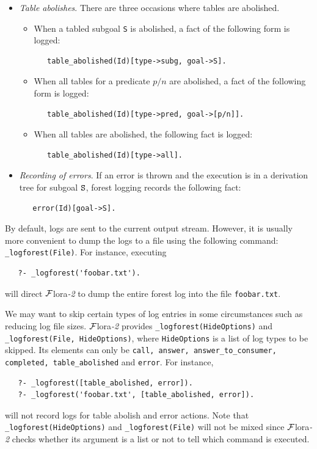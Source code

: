 \documentclass[11pt]{article}
\newcommand{\FLORA}{{\mbox{\sc ${\cal F}${lora}\rm\emph{-2}}}\xspace}
\begin{document}
\begin{itemize}
\item \emph{Table abolishes}. There are three occasions where tables are abolished.
  \begin{itemize}
  \item When a tabled subgoal \texttt{S} is abolished, a fact of 
    the following form is logged:
\begin{verbatim}
   table_abolished(Id)[type->subg, goal->S].
\end{verbatim}  
  \item When all tables for a predicate $p/n$ are abolished, a fact of the 
    following form is logged:
\begin{verbatim}
   table_abolished(Id)[type->pred, goal->[p/n]].
\end{verbatim}  
  \item When all tables are abolished, the following fact is logged:
\begin{verbatim}
   table_abolished(Id)[type->all].
\end{verbatim}  
  \end{itemize}

\item \emph{Recording of errors}. If an error is thrown and the execution
  is in a derivation tree for subgoal $\tt S$, forest logging records 
  the following fact:
\begin{verbatim}
   error(Id)[goal->S].
\end{verbatim}  
\end{itemize}

By default, logs are sent to the current output stream. However, it is
usually more convenient
to dump the logs to a file using the following command:
{\tt \_logforest(File)}. For instance,
executing
\begin{verbatim}
   ?- _logforest('foobar.txt').
\end{verbatim}
will direct \FLORA to dump the entire forest log into the file {\tt foobar.txt}.

We may want to skip certain types of log entries in some circumstances such
as reducing log file sizes. \FLORA provides {\tt \_logforest(HideOptions)} and 
{\tt \_logforest(File, HideOptions)}, where {\tt HideOptions} is a list of log
types to be skipped.
Its elements can only be {\tt call, answer, answer\_to\_consumer, completed, 
table\_abolished} and {\tt error}. For instance, 
\begin{verbatim}
   ?- _logforest([table_abolished, error]).
   ?- _logforest('foobar.txt', [table_abolished, error]).
\end{verbatim}
will not record logs for table abolish and error actions. 
Note that {\tt \_logforest(HideOptions)} and {\tt \_logforest(File)} will not 
be mixed since \FLORA checks whether its argument is a list or not to tell 
which command is executed. 
\end{document}
